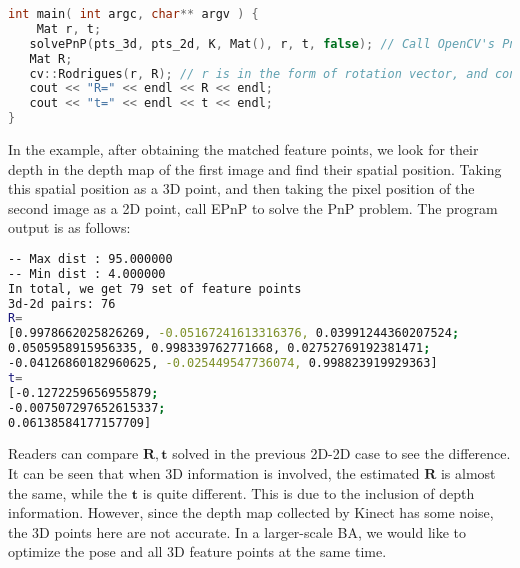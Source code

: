 \begin{lstlisting}[language=c++,caption=slambook2/ch7/pose_estimation_3d2d.cpp（片段）]
int main( int argc, char** argv ) {
    Mat r, t;
   solvePnP(pts_3d, pts_2d, K, Mat(), r, t, false); // Call OpenCV's PnP, you can choose from EPNP, DLS and other methods
   Mat R;
   cv::Rodrigues(r, R); // r is in the form of rotation vector, and converted to a rotation matrix by Rodrigues formula
   cout << "R=" << endl << R << endl;
   cout << "t=" << endl << t << endl;
}
\end{lstlisting}

In the example, after obtaining the matched feature points, we look for their depth in the depth map of the first image and find their spatial position. Taking this spatial position as a 3D point, and then taking the pixel position of the second image as a 2D point, call EPnP to solve the PnP problem. The program output is as follows:

\begin{lstlisting}[language=sh,caption=终端输入：]
% build/pose_estimation_3d2d 1.png 2.png d1.png d2.png
-- Max dist : 95.000000 
-- Min dist : 4.000000 
In total, we get 79 set of feature points
3d-2d pairs: 76
R=
[0.9978662025826269, -0.05167241613316376, 0.03991244360207524;
0.0505958915956335, 0.998339762771668, 0.02752769192381471;
-0.04126860182960625, -0.025449547736074, 0.998823919929363]
t=
[-0.1272259656955879;
-0.007507297652615337;
0.06138584177157709]
\end{lstlisting}

Readers can compare $\mathbf{R},\mathbf{t}$ solved in the previous 2D-2D case to see the difference. It can be seen that when 3D information is involved, the estimated $\mathbf{R}$ is almost the same, while the $\mathbf{t}$ is quite different. This is due to the inclusion of depth information. However, since the depth map collected by Kinect has some noise, the 3D points here are not accurate. In a larger-scale BA, we would like to optimize the pose and all 3D feature points at the same time.


